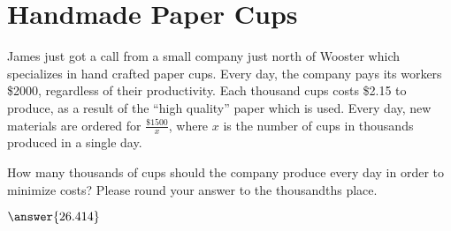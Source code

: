 \documentclass{ximera}
\begin{document}
\section{Handmade Paper Cups}
James just got a call from a small company just north of Wooster which specializes in hand crafted paper cups. Every day, the company pays its workers \$2000, regardless of their productivity. Each thousand cups costs \$2.15 to produce, as a result of the ``high quality'' paper which is used. Every day, new materials are ordered for $\frac{\$1500}{x}$, where $x$ is the number of cups in thousands produced in a single day.
\begin{question}
How many thousands of cups should the company produce every day in order to minimize costs? Please round your answer to the thousandths place.

$\answer{26.414}$
\end{question}
\pagebreak
\end{document}
